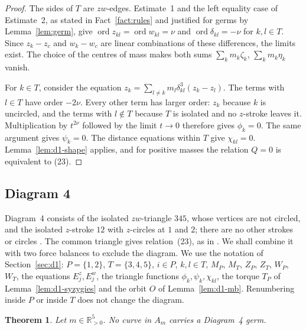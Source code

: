 \documentclass[Threeside,11pt]{article}
\newtheorem{theorem}{Theorem}[section]
\theoremstyle{definition}
\theoremstyle{remark}
\numberwithin{equation}{section}
\theoremstyle{remark}
\newcommand{\Rp}{\mathbb{R}_{>0}}
\newcommand{\ord}{\operatorname{ord}}
\begin{document}
\begin{proof}
{The sides of $T$ are $zw$-edges. Estimate~1 and the left equality case of Estimate~2,
as stated in Fact~\ref{fact:rules} and justified for germs by Lemma~\ref{lem:germ}, give
$\ord z_{kl}=\ord w_{kl}=\nu$ and $\ord\delta_{kl}=-\nu$ for $k,l\in T$.
Since $z_k-z_c$ and $w_k-w_c$ are linear combinations of these differences, the limits exist.
The choice of the centres of mass makes both sums $\sum_km_k\zeta_k$, $\sum_km_k\eta_k$ vanish.

For $k\in T$, consider the equation $z_k=\sum_{l\ne k}m_l\delta_{kl}^3(z_k-z_l)$.
The terms with $l\in T$ have order $-2\nu$. Every other term has larger order:
$z_k$ because $k$ is uncircled, and the terms with $l\notin T$ because $T$ is isolated
and no $z$-stroke leaves it. Multiplication by $t^{2\nu}$ followed by the limit $t\to0$
therefore gives $\phi_k=0$. The same argument gives $\psi_k=0$.
The distance equations within $T$ give $\chi_{kl}=0$.
Lemma~\ref{lem:d1-shape} applies, and for positive masses the relation $Q=0$ is equivalent to (23).}
\end{proof}

\subsection{Diagram 4}\label{sec:d4}

Diagram~4 consists of the isolated $zw$-triangle $345$, whose vertices are not circled, and the
isolated $z$-stroke $12$ with $z$-circles at $1$ and $2$; there are no other strokes or circles
\cite[\S7.4, p.~567, and Fig.~11]{AK}.
The common triangle gives relation~(23), as in \cite[\S8.4]{AK}.
We shall combine it with two force balances to exclude the diagram. We use the notation of
Section~\ref{sec:d1}: $P=\{1,2\}$, $T=\{3,4,5\}$, $i\in P$, $k,l\in T$, $M_P$, $M_T$, $Z_P$, $Z_T$,
$W_P$, $W_T$, the equations $E^z_j,E^w_j$, the triangle functions $\phi_k,\psi_k,\chi_{kl}$, the
torque $T_P$ of Lemma~\ref{lem:d1-syzygies} and the orbit $O$ of Lemma~\ref{lem:d1-mb}.
Renumbering inside $P$ or inside $T$ does not change the diagram.

\begin{theorem}\label{thm:d4}
Let $m\in\Rp^5$.  No curve in $A_m$ carries a Diagram~4 germ.
\end{theorem}
\end{document}
